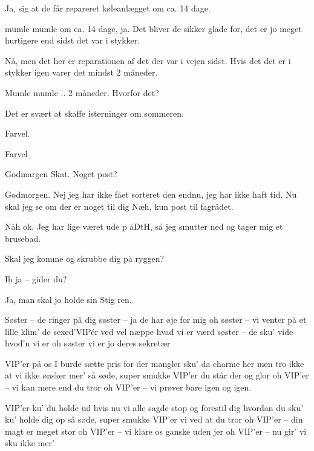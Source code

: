 \documentclass[a4paper,11pt]{article}
\begin{document}
\begin{sketch}
 Ja, sig at de får repareret køleanlægget om ca. 14 dage.

   mumle mumle om ca. 14 dage, ja. Det bliver de sikker
glade for, det er jo meget hurtigere end sidst det var i stykker.

 Nå, men det her er reparationen af det der var i vejen sidst. Hvis det
det er i stykker igen varer det mindst 2 måneder.

 Mumle mumle .. 2 måneder. Hvorfor det?

 Det er svært at skaffe isterninger om sommeren.

 Farvel.

 Farvel 


 Godmargen Skat. Noget post?

 Godmorgen. Nej jeg har ikke fået sorteret den endnu, jeg har ikke haft
tid. Nu skal jeg se om der er noget til dig  Næh, kun post til fagrådet.

 Nåh ok. Jeg har lige været ude p åDtH, så jeg smutter ned og tager mig
et brusebad.

 Skal jeg komme og skrubbe dig på ryggen?

 Ih ja -- gider du?

 Ja, man skal jo holde sin Stig ren.


\end{sketch}

\begin{song}

Søster -- de ringer på dig
søster -- ja de har øje for mig
oh søster -- vi venter på et lille klim'
de sexed'VIPér ved vel næppe
hvad vi er værd
søster -- de sku' vide hvod'n vi er
oh søster vi er jo deres sekretær

VIP'er
på os I burde sætte pris
for der mangler sku' da charme her
men tro ikke
at vi ikke ønsker mer'
så søde, super smukke VIP'er
du står der og glor
oh VIP'er -- vi kan mere end du tror
oh VIP'er -- vi prøver bare igen og igen.

VIP'er ku' du holde ud
hvis nu vi alle sagde stop
og forestil dig
hvordan du sku' ku' holde dig op
så søde, super smukke VIP'er
vi ved at du tror
oh VIP'er -- din magt er meget stor
oh VIP'er -- vi klare os ganske uden jer
oh VIP'er -- nu gir' vi sku ikke mer'
\end{song}
\end{document}
